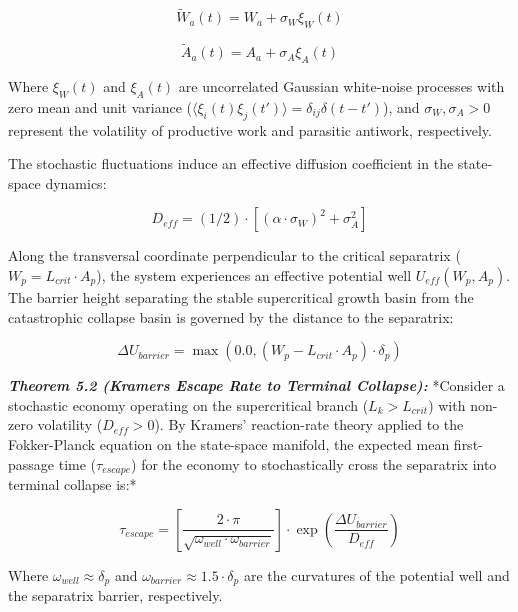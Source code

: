 \documentclass[preprint,12pt,authoryear]{elsarticle}
\theoremstyle{definition}
\begin{document}
$$\tilde{W}_a(t) = W_a + \sigma_W \xi_W(t)$$

$$\tilde{A}_a(t) = A_a + \sigma_A \xi_A(t)$$

Where $\xi_W(t)$ and $\xi_A(t)$ are uncorrelated Gaussian white-noise processes with zero mean and unit variance ($\langle \xi_i(t) \xi_j(t') \rangle = \delta_{ij} \delta(t - t')$), and $\sigma_W, \sigma_A > 0$ represent the volatility of productive work and parasitic antiwork, respectively.

The stochastic fluctuations induce an effective diffusion coefficient in the state-space dynamics:

$$D_{eff} = (1/2) \cdot [(\alpha \cdot \sigma_W)^2 + \sigma_A^2]$$

Along the transversal coordinate perpendicular to the critical separatrix ($W_p = L_{crit} \cdot A_p$), the system experiences an effective potential well $U_{eff}(W_p, A_p)$. The barrier height separating the stable supercritical growth basin from the catastrophic collapse basin is governed by the distance to the separatrix:

$$\Delta U_{barrier} = \max(0.0, (W_p - L_{crit} \cdot A_p) \cdot \delta_p)$$

\textbf{\textit{Theorem 5.2 (Kramers Escape Rate to Terminal Collapse):}} *Consider a stochastic economy operating on the supercritical branch ($L_k > L_{crit}$) with non-zero volatility ($D_{eff} > 0$). By Kramers' reaction-rate theory applied to the Fokker-Planck equation on the state-space manifold, the expected mean first-passage time ($\tau_{escape}$) for the economy to stochastically cross the separatrix into terminal collapse is:*

$$\tau_{escape} = \left[ \frac{2 \cdot \pi}{\sqrt{\omega_{well} \cdot \omega_{barrier}}} \right] \cdot \exp\left( \frac{\Delta U_{barrier}}{D_{eff}} \right)$$

Where $\omega_{well} \approx \delta_p$ and $\omega_{barrier} \approx 1.5 \cdot \delta_p$ are the curvatures of the potential well and the separatrix barrier, respectively.
\end{document}
